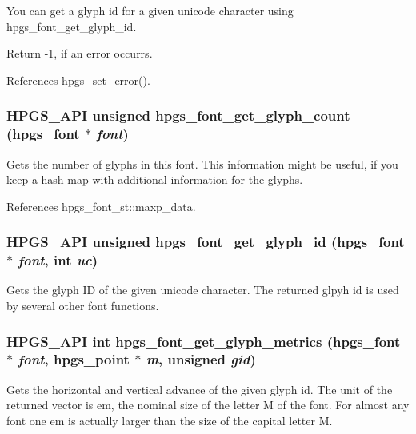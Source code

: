 You can get a glyph id for a given unicode character using {\ttfamily hpgs\_\-font\_\-get\_\-glyph\_\-id}.

Return -\/1, if an error occurrs. 

References hpgs\_\-set\_\-error().

\subsubsection[{hpgs\_\-font\_\-get\_\-glyph\_\-count}]{\setlength{\rightskip}{0pt plus 5cm}HPGS\_\-API unsigned hpgs\_\-font\_\-get\_\-glyph\_\-count ({\bf hpgs\_\-font} $\ast$ {\em font})}\label{group__font_ga7c2cc74c151939a86011d1985e121e89}
Gets the number of glyphs in this font. This information might be useful, if you keep a hash map with additional information for the glyphs. 

References hpgs\_\-font\_\-st::maxp\_\-data.

\subsubsection[{hpgs\_\-font\_\-get\_\-glyph\_\-id}]{\setlength{\rightskip}{0pt plus 5cm}HPGS\_\-API unsigned hpgs\_\-font\_\-get\_\-glyph\_\-id ({\bf hpgs\_\-font} $\ast$ {\em font}, \/  int {\em uc})}\label{group__font_ga77eece2579503c8b8f61b457b330d3aa}
Gets the glyph ID of the given unicode character. The returned glpyh id is used by several other font functions. 
\subsubsection[{hpgs\_\-font\_\-get\_\-glyph\_\-metrics}]{\setlength{\rightskip}{0pt plus 5cm}HPGS\_\-API int hpgs\_\-font\_\-get\_\-glyph\_\-metrics ({\bf hpgs\_\-font} $\ast$ {\em font}, \/  {\bf hpgs\_\-point} $\ast$ {\em m}, \/  unsigned {\em gid})}\label{group__font_ga56eca584198b3a74e06929a036f6ea8a}
Gets the horizontal and vertical advance of the given glyph id. The unit of the returned vector is em, the nominal size of the letter M of the font. For almost any font one em is actually larger than the size of the capital letter M.

